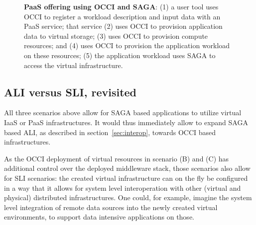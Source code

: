 \documentclass[10pt,conference,final,letterpaper,twoside,twocolumn,]{IEEEtran}
\newcommand{\B}[1]{\textbf{#1}}
\begin{document}
 \begin{figure}[htb]
  \caption{\footnotesize\label{fig:arch3} \B{PaaS offering using 
      OCCI and SAGA}: 
      (1) a user tool uses OCCI to register a workload 
          description and input data with an PaaS service; 
      that service 
      (2) uses OCCI to provision application data to virtual storage; 
      (3) uses OCCI to provision compute resources; and
      (4) uses OCCI to provision the application workload on these resources; 
      (5) the application workload uses SAGA to access the virtual
          infrastructure.}
 \end{figure}


 \subsection{ALI versus SLI, revisited}

 All three scenarios above allow for SAGA based applications to
 utilize virtual IaaS or PaaS infrastructures.  It would thus
 immediately allow to expand SAGA based ALI, as described in
 section~\ref{sec:interop}, towards OCCI based infrastructures.

 As the OCCI deployment of virtual resources in scenario (B) and (C)
 has additional control over the deployed middleware stack, those
 scenarios also allow for SLI scenarios: the created virtual
 infrastructure can on the fly be configured in a way that it allows
 for system level interoperation with other (virtual and physical)
 distributed infrastructures.  One could, for example, imagine the
 system level integration of remote data sources into the newly
 created virtual environments, to support data intensive applications
 on those.
\end{document}
